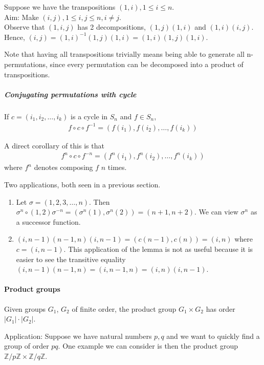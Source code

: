 \documentclass{article}
\begin{document}
Suppose we have the transpositions $(1,i), 1\leq i\leq n$.\\
Aim: Make $(i,j), 1\leq i,j\leq n, i\neq j$.\\
Observe that $(1,i,j)$ has 2 decompositions, $(1,j)(1,i)$ and $(1,i)(i,j)$. Hence, $(i,j) = (1,i)^{-1}(1,j)(1,i) = (1,i)(1,j)(1,i)$.

Note that having all transpositions trivially means being able to generate all n-permutations, since every permutation can be decomposed into a product of transpositions.

\subparagraph{Conjugating permutations with cycle}
If $c=(i_1,i_2,\dots,i_k)$ is a cycle in $S_n$ and $f\in S_n$,
\begin{align*}
	f\circ c\circ f^{-1} = (f(i_1),f(i_2),\dots,f(i_k))
\end{align*}

A direct corollary of this is that
\begin{align*}
	f^n\circ c\circ f^{-n} = (f^n(i_1),f^n(i_2),\dots,f^n(i_k))
\end{align*}
where $f^n$ denotes composing $f$ $n$ times.

Two applications, both seen in a previous section.
\begin{enumerate}
	\item Let $\sigma = (1,2,3,\dots,n)$. Then $\sigma^n\circ (1,2)\sigma^{-n} = (\sigma^n(1),\sigma^n(2)) = (n+1,n+2)$. We can view $\sigma^n$ as a successor function.
	\item $(i,n-1)(n-1,n)(i,n-1)=(c(n-1),c(n))=(i,n)$ where $c = (i,n-1)$. This application of the lemma is not as useful because it is easier to see the transitive equality $(i,n-1)(n-1,n) = (i,n-1,n) = (i,n)(i,n-1)$.
\end{enumerate}


\paragraph{Product groups}
Given groups $G_1$, $G_2$ of finite order, the product group $G_1\times G_2$ has order $|G_1|\cdot |G_2|$.

Application: Suppose we have natural numbers $p,q$ and we want to quickly find a group of order $pq$. One example we can consider is then the product group $\mathbb{Z}/p\mathbb{Z} \times \mathbb{Z}/q\mathbb{Z}$.
\end{document}
